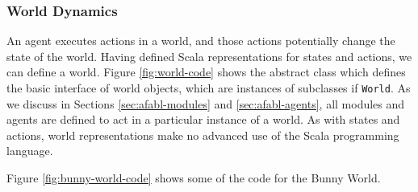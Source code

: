 \subsubsection{World Dynamics}

An agent executes actions in a world, and those actions potentially change the state of the world. Having defined Scala representations for states and actions, we can define a world. Figure \ref{fig:world-code} shows the abstract class which defines the basic interface of world objects, which are instances of subclasses if {\tt World}. As we discuss in Sections \ref{sec:afabl-modules} and \ref{sec:afabl-agents}, all modules and agents are defined to act in a particular instance of a world. As with states and actions, world representations make no advanced use of the Scala programming language.







Figure \ref{fig:bunny-world-code} shows some of the code for the Bunny World.

